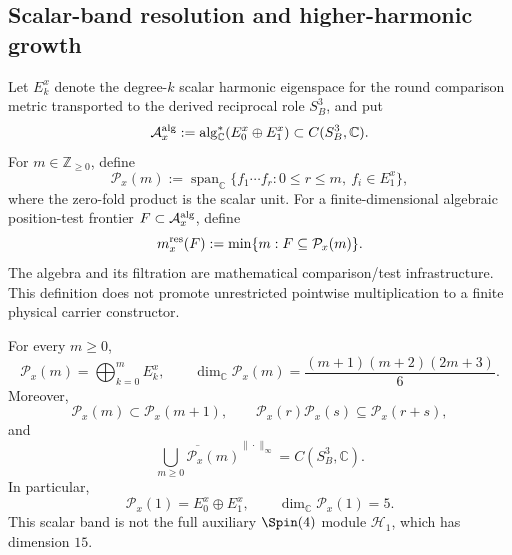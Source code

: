 \documentclass[12pt,a4paper]{article}
\begin{document}
\subsection{Scalar-band resolution and higher-harmonic growth}

\begin{definition}
\label{p2c:def:reciprocal-scalar-resolution}
Let \(E_k^x\) denote the degree-\(k\) scalar harmonic eigenspace for the round
comparison metric transported to the derived reciprocal role \(S^3_B\), and
put
\[
 \mathcal A_x^{\rm alg}
 :=\operatorname{alg}_{\mathbb C}^{*}(E_0^x\oplus E_1^x)
 \subset C(S^3_B,\mathbb C).
\]
For \(m\in\mathbb Z_{\ge0}\), define
\[
 \mathcal P_x(m)
 :=\operatorname{span}_{\mathbb C}
 \{f_1\cdots f_r:0\le r\le m,\ f_i\in E_1^x\},
\]
where the zero-fold product is the scalar unit.  For a finite-dimensional
algebraic position-test frontier \(F\subset\mathcal A_x^{\rm alg}\), define
\[
 m_x^{\rm res}(F)
 :=\min\{m:F\subseteq\mathcal P_x(m)\}.
\]
The algebra and its filtration are mathematical comparison/test
infrastructure.  This definition does not promote unrestricted pointwise
multiplication to a finite physical carrier constructor.
\end{definition}

\begin{theorem}
\label{p2c:thm:exact-reciprocal-scalar-bands}
For every \(m\ge0\),
\[
 \boxed{\mathcal P_x(m)=\bigoplus_{k=0}^{m}E_k^x},
 \qquad
 \boxed{\dim_{\mathbb C}\mathcal P_x(m)
 =\frac{(m+1)(m+2)(2m+3)}6}.
\]
Moreover,
\[
 \mathcal P_x(m)\subset\mathcal P_x(m+1),
 \qquad
 \mathcal P_x(r)\mathcal P_x(s)\subseteq\mathcal P_x(r+s),
\]
and
\[
 \overline{\bigcup_{m\ge0}\mathcal P_x(m)}^{\|\cdot\|_\infty}
 =C(S^3_B,\mathbb C).
\]
In particular,
\[
 \mathcal P_x(1)=E_0^x\oplus E_1^x,
 \qquad
 \dim_{\mathbb C}\mathcal P_x(1)=5.
\]
This scalar band is not the full auxiliary \(\Spin(4)\) module
\(\mathcal H_1\), which has dimension \(15\).
\end{theorem}
\end{document}
